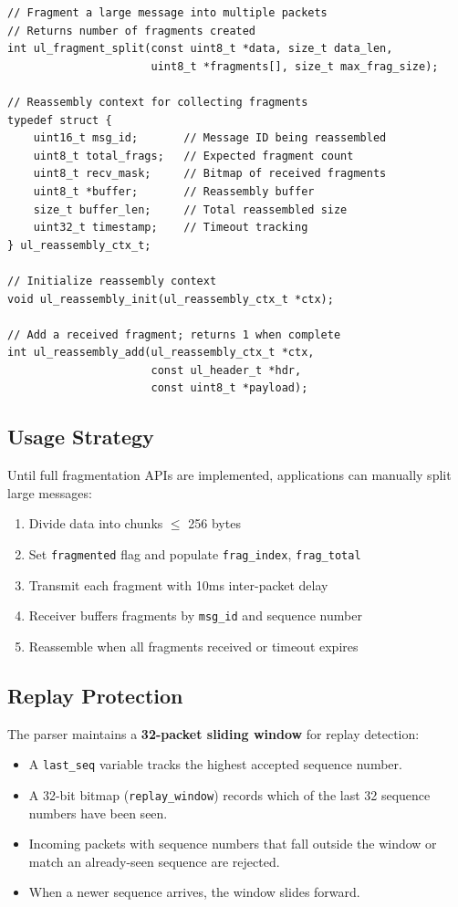 \documentclass[11pt,a4paper]{article}
\begin{document}
\begin{lstlisting}
// Fragment a large message into multiple packets
// Returns number of fragments created
int ul_fragment_split(const uint8_t *data, size_t data_len,
                      uint8_t *fragments[], size_t max_frag_size);

// Reassembly context for collecting fragments
typedef struct {
    uint16_t msg_id;       // Message ID being reassembled
    uint8_t total_frags;   // Expected fragment count
    uint8_t recv_mask;     // Bitmap of received fragments
    uint8_t *buffer;       // Reassembly buffer
    size_t buffer_len;     // Total reassembled size
    uint32_t timestamp;    // Timeout tracking
} ul_reassembly_ctx_t;

// Initialize reassembly context
void ul_reassembly_init(ul_reassembly_ctx_t *ctx);

// Add a received fragment; returns 1 when complete
int ul_reassembly_add(ul_reassembly_ctx_t *ctx, 
                      const ul_header_t *hdr,
                      const uint8_t *payload);
\end{lstlisting}

\subsection{Usage Strategy}

Until full fragmentation APIs are implemented, applications can manually split large messages:

\begin{enumerate}[noitemsep]
    \item Divide data into chunks $\leq$ 256 bytes
    \item Set \texttt{fragmented} flag and populate \texttt{frag\_index}, \texttt{frag\_total}
    \item Transmit each fragment with 10ms inter-packet delay
    \item Receiver buffers fragments by \texttt{msg\_id} and sequence number
    \item Reassemble when all fragments received or timeout expires
\end{enumerate}

\subsection{Replay Protection}

The parser maintains a \textbf{32-packet sliding window} for replay detection:
\begin{itemize}[noitemsep]
    \item A \texttt{last\_seq} variable tracks the highest accepted sequence number.
    \item A 32-bit bitmap (\texttt{replay\_window}) records which of the last 32 sequence numbers have been seen.
    \item Incoming packets with sequence numbers that fall outside the window or match an already-seen sequence are rejected.
    \item When a newer sequence arrives, the window slides forward.
\end{itemize}
\end{document}
